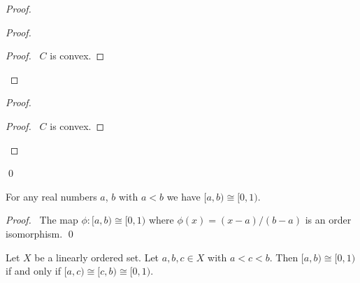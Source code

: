 \begin{proof}
  \pf
  \begin{proof}
    \begin{proof}
      \pf\ $C$ is convex.
    \end{proof}
  \end{proof}
  \begin{proof}
    \pf
    \begin{proof}
      \pf\ $C$ is convex.
    \end{proof}
  \end{proof}
  \qed
\end{proof}

\begin{lm}
  \label{lm:order:half_open}
  For any real numbers $a$, $b$ with $a < b$ we have $[a, b) \cong [0, 1)$.
\end{lm}

\begin{proof}
  \pf\ The map $\phi : [a, b) \cong [0, 1)$ where $\phi(x) = (x - a) / (b -
  a)$ is an order isomorphism. \qed
\end{proof}

\begin{prop}
  \label{prop:order:zero_one_twice}
  Let $X$ be a linearly ordered set. Let $a, b, c \in X$ with $a < c < b$.
  Then $[a, b) \cong [0, 1)$ if and only if $[a, c) \cong [c, b) \cong [0,
  1)$.
\end{prop}

